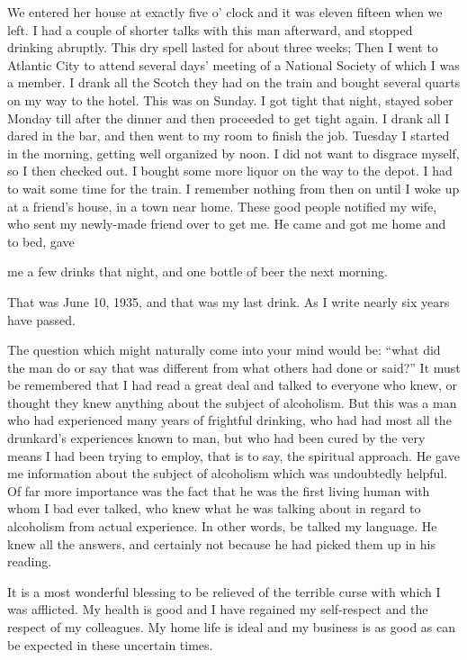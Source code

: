 \begin{biblechapter}
We entered her house at exactly five o’ clock and it was eleven fifteen when we left. I had a couple of shorter talks with this man afterward, and stopped drinking abruptly. This dry spell lasted for about three weeks; Then I went to Atlantic City to attend several days’ meeting of a National Society of which I was a member. I drank all the Scotch they had on the train and bought several quarts on my way to the hotel. This was on Sunday. I got tight that night, stayed sober Monday till after the dinner and then proceeded to get tight again. I drank all I dared in the bar, and then went to my room to finish the job. Tuesday I started in the morning, getting well organized by noon. I did not want to disgrace myself, so I then checked out. I bought some more liquor on the way to the depot. I had to wait some time for the train. I remember nothing from then on until I woke up at a friend’s house, in a town near home. These good people notified my wife, who sent my newly-made friend over to get me. He came and got me home and to bed, gave

me a few drinks that night, and one bottle of beer the next morning.

That was June 10, 1935, and that was my last drink. As I write nearly six years have passed.

The question which might naturally come into your mind would be: “what did the man do or say that was different from what others had done or said?” It must be remembered that I had read a great deal and talked to everyone who knew, or thought they knew anything about the subject of alcoholism. But this was a man who had experienced many years of frightful drinking, who had had most all the drunkard’s experiences known to man, but who had been cured by the very means I had been trying to employ, that is to say, the spiritual approach. He gave me information about the subject of alcoholism which was undoubtedly helpful. Of far more importance was the fact that he was the first living human with whom I bad ever talked, who knew what he was talking about in regard to alcoholism from actual experience. In other words, be talked my language. He knew all the answers, and certainly not because he had picked them up in his reading.

It is a most wonderful blessing to be relieved of the terrible curse with which I was afflicted. My health is good and I have regained my self-respect and the respect of my colleagues. My home life is ideal and my business is as good as can be expected in these uncertain times.


\end{biblechapter}
